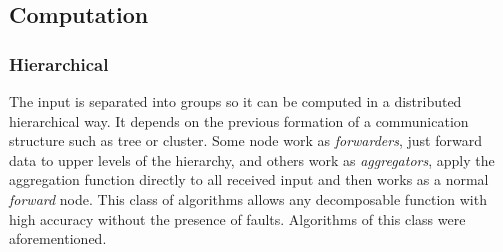 \subsection{Computation}
\subsubsection{Hierarchical}
The input is separated into groups so it can be computed in a distributed hierarchical way.  It depends on the previous formation of a communication structure such as tree or cluster. Some node work as \textit{forwarders}, just forward data to upper levels of the hierarchy, and others work as \textit{aggregators}, apply the aggregation function directly to all received input and then works as a normal \textit{forward} node. This class of algorithms allows any decomposable function with high accuracy without the presence of faults. Algorithms of this class were aforementioned.
